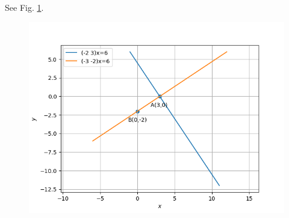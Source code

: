 \documentclass[12pt]{article}
\begin{document}
See Fig. 
\ref{fig:11/10/4/3line segment}.
\begin{figure}[h!]
\centering
\includegraphics[width=\columnwidth]{chapters/11/10/4/3/figs/inter.png}
\caption{}
\label{fig:11/10/4/3line segment}
\end{figure}
\end{document}
